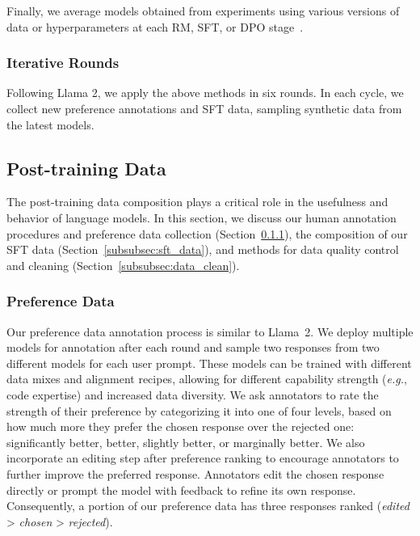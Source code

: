 Finally, we average models obtained from experiments using various versions of data or hyperparameters at each RM, SFT, or DPO stage~\citep{izmailov2019averagingweightsleadswider,wortsman2022modelsoupsaveragingweights, li2022branchtrainmergeembarrassinglyparalleltraining}. 

\subsubsection{Iterative Rounds}

Following Llama 2, we apply the above methods in six rounds. In each cycle, we collect new preference annotations and SFT data, sampling synthetic data from the latest models. 

\subsection{Post-training Data}
\label{sec:finetuning_data}

The post-training data composition plays a critical role in the usefulness and behavior of language models. In this section, we discuss our human annotation procedures and preference data collection (Section~\ref{sec:rlhf_annotation_data}), the composition of our SFT data (Section~\ref{subsubsec:sft_data}), and methods for data quality control and cleaning (Section~\ref{subsubsec:data_clean}).


\subsubsection{Preference Data} 
\label{sec:rlhf_annotation_data}

Our preference data annotation process is similar to Llama~2. We deploy multiple models for annotation after each round and sample two responses from two different models for each user prompt. These models can be trained with different data mixes and alignment recipes, allowing for different capability strength (\emph{e.g.}, code expertise) and increased data diversity. We ask annotators to rate the strength of their preference by categorizing it into one of four levels, based on how much more they prefer the chosen response over the rejected one: significantly better, better, slightly better, or marginally better. We also incorporate an editing step after preference ranking to encourage annotators to further improve the preferred response. Annotators edit the chosen response directly or prompt the model with feedback to refine its own response. Consequently, a portion of our preference data has three responses ranked (\emph{edited} > \emph{chosen} > \emph{rejected}).

